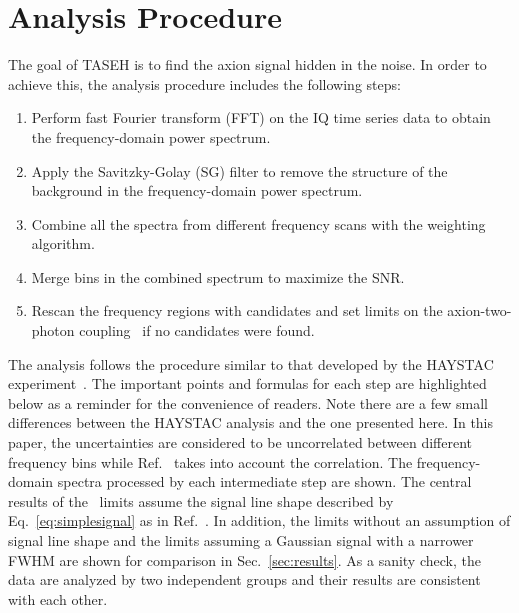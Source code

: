 \section{Analysis Procedure} \label{sec:ana}
The goal of TASEH is to find the axion signal hidden in the noise. In 
order to achieve this, the analysis procedure includes the following steps:
    \begin{enumerate}
        \item Perform fast Fourier transform (FFT) on the 
IQ time series data to obtain the frequency-domain power spectrum.
        \item Apply the Savitzky-Golay (SG) filter to remove the structure 
of the background in the frequency-domain power spectrum.
        \item Combine all the spectra from different frequency scans with 
the weighting algorithm.
        \item Merge bins in the combined spectrum to maximize the SNR. 
       \item Rescan the frequency regions with candidates and set limits on 
      the axion-two-photon coupling \gagg\ if no candidates were found.
    \end{enumerate}

    The analysis follows the procedure similar to that 
developed by the HAYSTAC experiment~\cite{HAYSTACII}. The important points  
and formulas for each step are highlighted below as a reminder 
for the convenience of readers. Note there are a few  
small differences between the HAYSTAC analysis and the one presented here. 
In this paper, the uncertainties are considered to be uncorrelated between 
different frequency bins while Ref.~\cite{HAYSTACII} takes into account 
the correlation. The frequency-domain spectra processed by each intermediate 
step are shown. The central results of the \gagg\ limits assume the signal 
line shape described by Eq.~\eqref{eq:simplesignal} as in 
Ref.~\cite{HAYSTACII}. In addition, the limits without an assumption of 
signal line shape and the limits assuming a 
Gaussian signal with a narrower FWHM are 
shown for comparison in Sec.~\ref{sec:results}. 
As a sanity check, the data are analyzed by two 
independent groups and their results are consistent with each other. 

